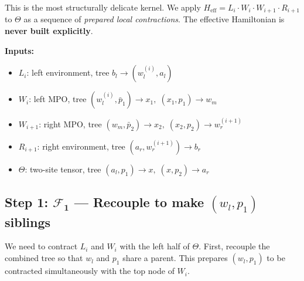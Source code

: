 \documentclass[11pt,a4paper]{article}
\newcommand{\Fmove}{\mathcal{F}}
\begin{document}
This is the most structurally delicate kernel.  We apply
$H_{\mathrm{eff}} = L_i \cdot W_i \cdot W_{i+1} \cdot R_{i+1}$
to $\Theta$ as a sequence of \emph{prepared local contractions}.
The effective Hamiltonian is \textbf{never built explicitly}.

\medskip
\noindent
\textbf{Inputs:}
\begin{itemize}[nosep]
  \item $L_i$: left environment, tree $b_l \to (w_l^{(i)}, a_l)$
  \item $W_i$: left MPO, tree $(w_l^{(i)}, \bar{p}_1) \to x_1,\; (x_1, p_1) \to w_m$
  \item $W_{i+1}$: right MPO, tree $(w_m, \bar{p}_2) \to x_2,\; (x_2, p_2) \to w_r^{(i+1)}$
  \item $R_{i+1}$: right environment, tree $(a_r, w_r^{(i+1)}) \to b_r$
  \item $\Theta$: two-site tensor, tree $(a_l, p_1) \to x,\; (x, p_2) \to a_r$
\end{itemize}

\subsection*{Step 1: $\boldsymbol{\Fmove_1}$ --- Recouple to make $(w_l, p_1)$ siblings}

We need to contract $L_i$ and $W_i$ with the left half of $\Theta$.
First, recouple the combined tree so that $w_l$ and $p_1$ share a parent.
This prepares $(w_l, p_1)$ to be contracted simultaneously with the top node of $W_i$.
\end{document}
